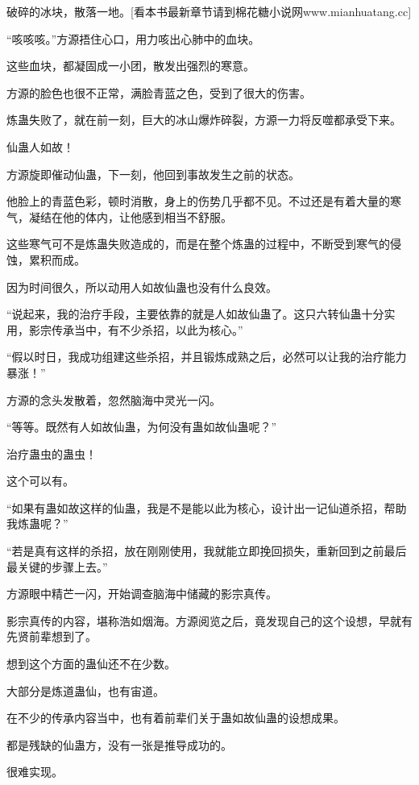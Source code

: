 
\begin{this_body}

破碎的冰块，散落一地。[看本书最新章节请到棉花糖小说网www.mianhuatang.cc]

“咳咳咳。”方源捂住心口，用力咳出心肺中的血块。

这些血块，都凝固成一小团，散发出强烈的寒意。

方源的脸色也很不正常，满脸青蓝之色，受到了很大的伤害。

炼蛊失败了，就在前一刻，巨大的冰山爆炸碎裂，方源一力将反噬都承受下来。

仙蛊人如故！

方源旋即催动仙蛊，下一刻，他回到事故发生之前的状态。

他脸上的青蓝色彩，顿时消散，身上的伤势几乎都不见。不过还是有着大量的寒气，凝结在他的体内，让他感到相当不舒服。

这些寒气可不是炼蛊失败造成的，而是在整个炼蛊的过程中，不断受到寒气的侵蚀，累积而成。

因为时间很久，所以动用人如故仙蛊也没有什么良效。

“说起来，我的治疗手段，主要依靠的就是人如故仙蛊了。这只六转仙蛊十分实用，影宗传承当中，有不少杀招，以此为核心。”

“假以时日，我成功组建这些杀招，并且锻炼成熟之后，必然可以让我的治疗能力暴涨！”

方源的念头发散着，忽然脑海中灵光一闪。

“等等。既然有人如故仙蛊，为何没有蛊如故仙蛊呢？”

治疗蛊虫的蛊虫！

这个可以有。

“如果有蛊如故这样的仙蛊，我是不是能以此为核心，设计出一记仙道杀招，帮助我炼蛊呢？”

“若是真有这样的杀招，放在刚刚使用，我就能立即挽回损失，重新回到之前最后最关键的步骤上去。”

方源眼中精芒一闪，开始调查脑海中储藏的影宗真传。

影宗真传的内容，堪称浩如烟海。方源阅览之后，竟发现自己的这个设想，早就有先贤前辈想到了。

想到这个方面的蛊仙还不在少数。

大部分是炼道蛊仙，也有宙道。

在不少的传承内容当中，也有着前辈们关于蛊如故仙蛊的设想成果。

都是残缺的仙蛊方，没有一张是推导成功的。

很难实现。


\end{this_body}
